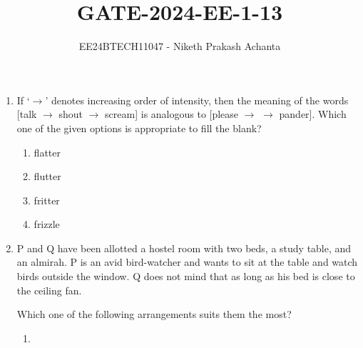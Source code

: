 \documentclass[journal]{IEEEtran}
\numberwithin{equation}{enumi}
\numberwithin{figure}{enumi}
\begin{document}


\title{GATE-2024-EE-1-13}
\author{EE24BTECH11047 - Niketh Prakash Achanta}
\maketitle
\begin{enumerate}
\item If ‘$\rightarrow$’ denotes increasing order of intensity, then the meaning of the words
        [talk $\rightarrow$ shout $\rightarrow$ scream] is analogous to [please $\rightarrow$ \underline{\hspace{1cm}} $\rightarrow$ pander].
    Which one of the given options is appropriate to fill the blank?
    \begin{enumerate}
        \item flatter
        \item flutter
        \item fritter
        \item frizzle
    \end{enumerate}
\item P and Q have been allotted a hostel room with two beds, a study table, and an almirah. P is an avid bird-watcher and wants to sit at the table and watch birds outside the window. Q does not mind that as long as his bed is close to the ceiling fan.

Which one of the following arrangements suits them the most?
\begin{enumerate}
    \item \begin{figure}[!ht]
\centering
{}%


\end{figure}
\end{enumerate}
\end{enumerate}
\end{document}
